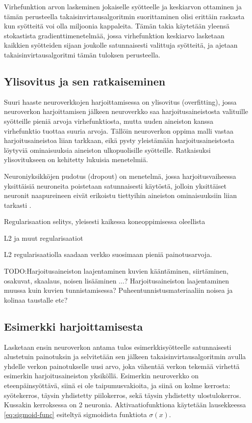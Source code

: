 \documentclass[finnish]{tktltiki2}
\theoremstyle{definition}
\theoremstyle{remark}
\begin{document}
  Virhefunktion arvon laskeminen jokaiselle syötteelle ja keskiarvon ottaminen ja tämän perusteella takaisinvirtausalgoritmin suorittaminen olisi erittäin raskasta kun syötteitä voi olla miljoonia kappaleita. Tämän takia käytetään yleensä stokastista gradienttimenetelmää, jossa virhefunktion keskiarvo lasketaan kaikkien syötteiden sijaan joukolle satunnaisesti valittuja syötteitä, ja ajetaan takaisinvirtausalgoritmi tämän tuloksen perusteella.

  \subsection{Ylisovitus ja sen ratkaiseminen}

  Suuri haaste neuroverkkojen harjoittamisessa on ylisovitus (overfitting), jossa neuroverkon harjoittamisen jälkeen neuroverkko saa harjoitusaineistosta valituille syötteille pieniä arvoja virhefunktiosta, mutta uuden aineiston kanssa virhefunktio tuottaa suuria arvoja. Tällöin neuroverkon oppima malli vastaa harjoitusaineistoa liian tarkkaan, eikä pysty yleistämään harjoitusaineistosta löytyviä ominaisuuksia aineiston ulkopuolisille syötteille. Ratkaisuksi ylisovitukseen on kehitetty lukuisia menetelmiä. 
  
  Neuroniyksikköjen pudotus (dropout) on menetelmä, jossa harjoitusvaiheessa yksittäisiä neuroneita poistetaan satunnaisesti käytöstä, jolloin yksittäiset neuronit naapureineen eivät erikoistu tiettyihin aineiston ominaisuuksiin liian tarkasti \cite{dropout-srivastava}.

  Regularisaation selitys, yleisesti kaikessa koneoppimisessa oleellista
  
  L2 ja muut regularisaatiot

  L2 regularisaatiolla saadaan verkko suosimaan pieniä painotusarvoja.

  TODO:Harjoitusaineiston laajentaminen kuvien kääntäminen, siirtäminen, osakuvat, skaalaus, noisen lisääminen ...?
  Harjoitusaineiston laajentaminen muussa kuin kuvien tunnistamisessa? Puheentunnistusmateriaaliin noisea ja kolinaa taustalle etc?

  \subsection{Esimerkki harjoittamisesta}

  Lasketaan ensin neuroverkon antama tulos esimerkkisyötteelle satunnaisesti alustetuin painotuksin ja selvitetään sen jälkeen takaisinvirtausalgoritmin avulla yhdelle verkon painotukselle uusi arvo, joka vähentää verkon tekemää virhettä esimerkin harjoitusaineiston yksiköllä. Esimerkin neuroverkko on eteenpäinsyöttävä, siinä ei ole taipumusvakioita, ja siinä on kolme kerrosta: syötekerros, täysin yhdistetty piilokerros, sekä täysin yhdistetty ulostulokerros. Kussakin kerroksessa on 2 neuronia.
   Aktivaatiofunktiona käytetään lausekkeessa \ref{eq:sigmoid-func} esiteltyä sigmoidista funktiota $\sigma (x)$.
\end{document}

